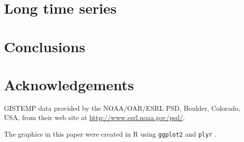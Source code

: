 \documentclass[oneside]{article}
\begin{document}
\section{Long time series}

\section{Conclusions}

\section*{Acknowledgements}

GISTEMP data provided by the NOAA/OAR/ESRL PSD, Boulder, Colorado,
USA, from their web site at \url{http://www.esrl.noaa.gov/psd/}.

The graphics in this paper were created in R \citep{R} using {\tt ggplot2} \citep{me:ggplot2} and {\tt plyr} \citep{me:plyr}. 


\end{document}

